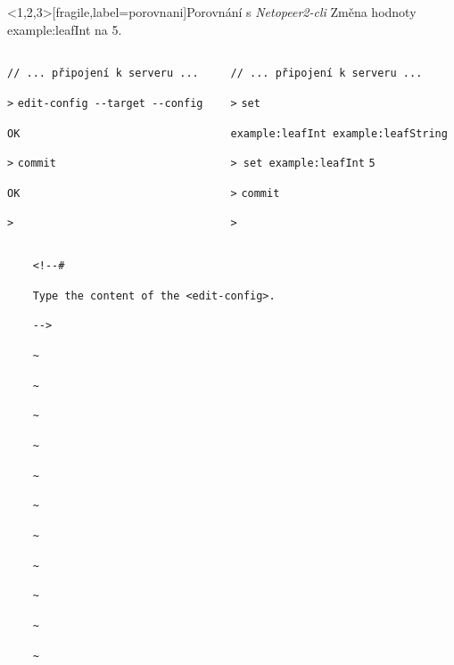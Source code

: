 \documentclass[czech,aspectratio=169]{beamer}
\begin{document}
\begin{frame}<1,2,3>[fragile,label=porovnani]{Porovnání s \textit{Netopeer2-cli}}
    Změna hodnoty example:leafInt na 5.
    \vfill
    \begin{columns}
        \pause{}
        \begin{column}{.47\textwidth}
            \verb|// ... připojení k serveru ...|

            \verb|>|\pause{} \verb|edit-config --target --config|

            \pause{}
            \verb|OK|

            \verb|>|\pause{} \verb|commit|

            \pause{}
            \verb|OK|

            \verb|>|

        \end{column}
        \pause{}
        \begin{column}{.47\textwidth}
            \verb|// ... připojení k serveru ...|

            \verb|>|\pause{} \verb|set |

            \pause{}
            \verb|example:leafInt example:leafString|

            \verb|> set example:leaf|\pause{}\verb|I|\pause{}\verb|nt|\pause{} \verb|5|

            \pause{}
            \verb|>|\pause{} \verb|commit|

            \verb|>|
        \end{column}
    \end{columns}
\end{frame}

\begin{frame}
    \verb|    <!--#|

    \verb|    Type the content of the <edit-config>.|

    \verb|    -->|

    \color{gray}
    \verb|    ~|

    \verb|    ~|

    \verb|    ~|

    \verb|    ~|

    \verb|    ~|

    \verb|    ~|

    \verb|    ~|

    \verb|    ~|

    \verb|    ~|

    \verb|    ~|

    \verb|    ~|

\end{frame}
\end{document}
